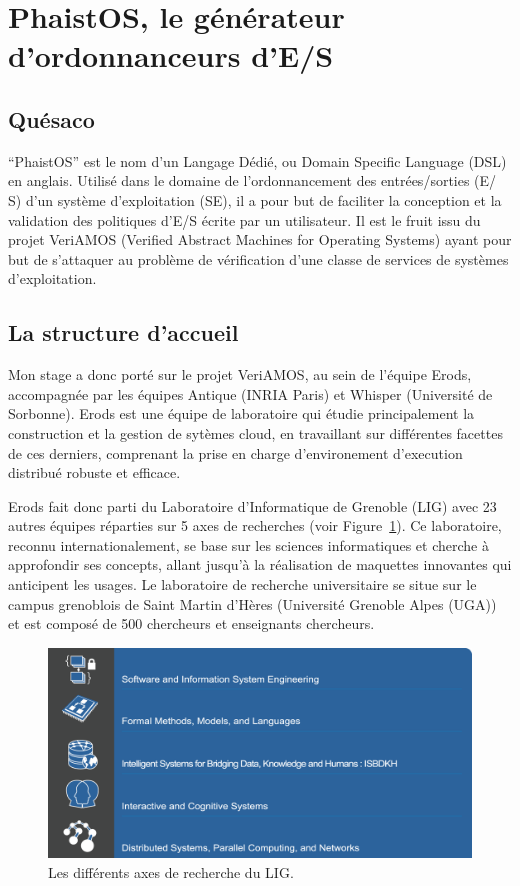 \section{PhaistOS, le générateur d'ordonnanceurs d'E/S}
\label{intro}

\subsection{Quésaco}

``PhaistOS'' est le nom d'un Langage Dédié, ou Domain Specific Language (DSL) 
en anglais. Utilisé dans le domaine de l'ordonnancement des entrées/sorties (E/
S) d'un système d'exploitation (SE), il a pour but de faciliter la conception 
et la validation des politiques d'E/S écrite par un utilisateur. Il est le 
fruit issu du projet VeriAMOS (Verified Abstract Machines for Operating 
Systems) ayant pour but de s'attaquer au problème de vérification d'une classe 
de services de systèmes d'exploitation.

\subsection{La structure d'accueil}

Mon stage a donc porté sur le projet VeriAMOS, au sein de l'équipe Erods, 
accompagnée par les équipes Antique (INRIA Paris) et Whisper (Université de 
Sorbonne). Erods est une équipe de laboratoire qui étudie principalement la 
construction et la gestion de sytèmes cloud, en travaillant sur différentes 
facettes de ces derniers, comprenant la prise en charge d'environement 
d'execution distribué robuste et efficace. 

Erods fait donc parti du Laboratoire d'Informatique de Grenoble (LIG) avec 23 
autres équipes réparties sur 5 axes de recherches (voir Figure~\ref{fig:lig}). 
Ce laboratoire, reconnu internationalement, se base sur les sciences 
informatiques et cherche à approfondir ses concepts, allant jusqu'à la 
réalisation de maquettes innovantes qui anticipent les usages. Le laboratoire 
de recherche universitaire se situe sur le campus grenoblois de Saint Martin 
d'Hères (Université Grenoble Alpes (UGA)) et est composé de 500 chercheurs et 
enseignants chercheurs.

\begin{figure}[h!t] \centering
    \includegraphics[width=12.5cm]{images/axeslig}
    \caption{Les différents axes de recherche du LIG.}
    \label{fig:lig}
\end{figure}

